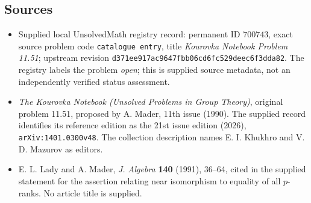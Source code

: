 \documentclass[11pt]{article}
\begin{document}
\subsection{Sources}
\begin{itemize}
\item Supplied local UnsolvedMath registry record: permanent ID \(700743\), exact source problem code \texttt{catalogue entry}, title \emph{Kourovka Notebook Problem 11.51}; upstream revision \texttt{d371ee917ac9647fbb06cd6fc529deec6f3dda82}. The registry labels the problem \emph{open}; this is supplied source metadata, not an independently verified status assessment.
\item \emph{The Kourovka Notebook (Unsolved Problems in Group Theory)}, original problem 11.51, proposed by A. Mader, 11th issue (1990). The supplied record identifies its reference edition as the 21st issue edition (2026), \texttt{arXiv:1401.0300v48}. The collection description names E. I. Khukhro and V. D. Mazurov as editors.
\item E. L. Lady and A. Mader, \emph{J. Algebra} \textbf{140} (1991), 36--64, cited in the supplied statement for the assertion relating near isomorphism to equality of all \(p\)-ranks. No article title is supplied.
\end{itemize}
\end{document}
